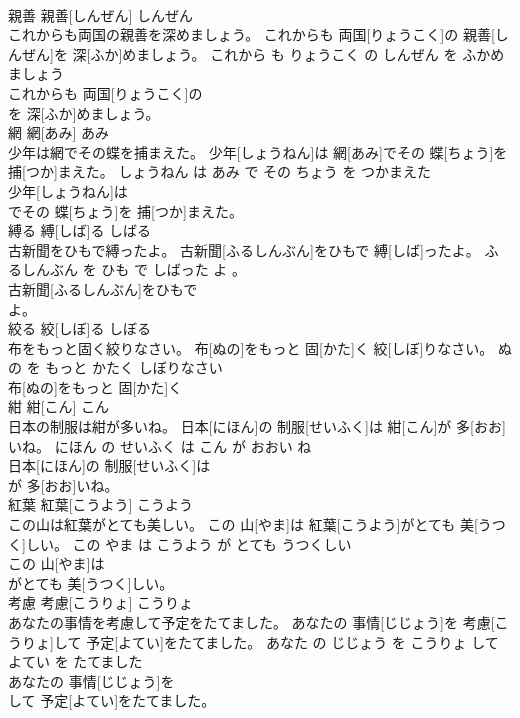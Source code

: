\documentclass[8pt]{extreport}
\begin{document}
\begin{CJK}{UTF8}{min}
\\	親善	親善[しんぜん]	しんぜん	
\\	これからも両国の親善を深めましょう。	これからも 両国[りょうこく]の 親善[しんぜん]を 深[ふか]めましょう。	これから も りょうこく の しんぜん を ふかめましょう	
\\	これからも 両国[りょうこく]の
\\	を 深[ふか]めましょう。			
\\	網	網[あみ]	あみ	
\\	少年は網でその蝶を捕まえた。	少年[しょうねん]は 網[あみ]でその 蝶[ちょう]を 捕[つか]まえた。	しょうねん は あみ で その ちょう を つかまえた	
\\	少年[しょうねん]は
\\	でその 蝶[ちょう]を 捕[つか]まえた。			
\\	縛る	縛[しば]る	しばる	
\\	古新聞をひもで縛ったよ。	古新聞[ふるしんぶん]をひもで 縛[しば]ったよ。	ふるしんぶん を ひも で しばった よ 。	
\\	古新聞[ふるしんぶん]をひもで
\\	よ。			
\\	絞る	絞[しぼ]る	しぼる	
\\	布をもっと固く絞りなさい。	布[ぬの]をもっと 固[かた]く 絞[しぼ]りなさい。	ぬの を もっと かたく しぼりなさい	
\\	布[ぬの]をもっと 固[かた]く
\\	紺	紺[こん]	こん	
\\	日本の制服は紺が多いね。	日本[にほん]の 制服[せいふく]は 紺[こん]が 多[おお]いね。	にほん の せいふく は こん が おおい ね	
\\	日本[にほん]の 制服[せいふく]は
\\	が 多[おお]いね。			
\\	紅葉	紅葉[こうよう]	こうよう	
\\	この山は紅葉がとても美しい。	この 山[やま]は 紅葉[こうよう]がとても 美[うつく]しい。	この やま は こうよう が とても うつくしい	
\\	この 山[やま]は
\\	がとても 美[うつく]しい。			
\\	考慮	考慮[こうりょ]	こうりょ	
\\	あなたの事情を考慮して予定をたてました。	あなたの 事情[じじょう]を 考慮[こうりょ]して 予定[よてい]をたてました。	あなた の じじょう を こうりょ して よてい を たてました	
\\	あなたの 事情[じじょう]を
\\	して 予定[よてい]をたてました。			

\end{CJK}
\end{document}
